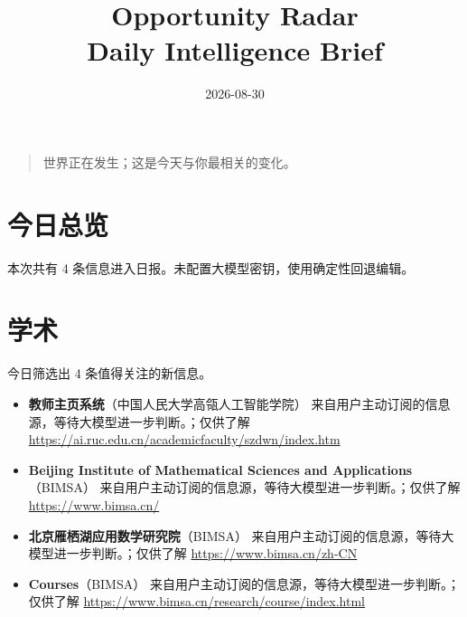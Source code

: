 \documentclass[11pt]{ctexart}
\title{Opportunity Radar\\Daily Intelligence Brief}
\date{2026-08-30}
\begin{document}
\maketitle
\begin{quote}\Large 世界正在发生；这是今天与你最相关的变化。\end{quote}
\section*{今日总览}
本次共有 4 条信息进入日报。未配置大模型密钥，使用确定性回退编辑。
\section*{学术}
今日筛选出 4 条值得关注的新信息。
\begin{itemize}
\item \textbf{教师主页系统}（中国人民大学高瓴人工智能学院） 来自用户主动订阅的信息源，等待大模型进一步判断。；仅供了解 \url{https://ai.ruc.edu.cn/academicfaculty/szdwn/index.htm}
\item \textbf{Beijing Institute of Mathematical Sciences and Applications}（BIMSA） 来自用户主动订阅的信息源，等待大模型进一步判断。；仅供了解 \url{https://www.bimsa.cn/}
\item \textbf{北京雁栖湖应用数学研究院}（BIMSA） 来自用户主动订阅的信息源，等待大模型进一步判断。；仅供了解 \url{https://www.bimsa.cn/zh-CN}
\item \textbf{Courses}（BIMSA） 来自用户主动订阅的信息源，等待大模型进一步判断。；仅供了解 \url{https://www.bimsa.cn/research/course/index.html}
\end{itemize}
\end{document}
